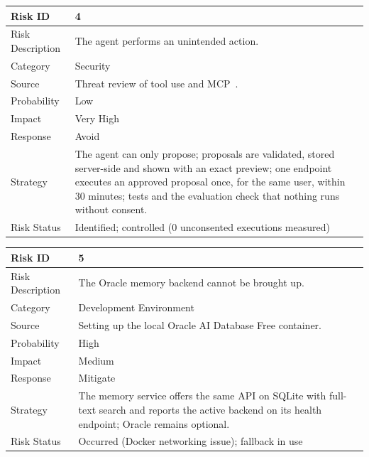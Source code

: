 \begin{table}[!htbp]
\begin{center}
\def\arraystretch{1.5}
\begin{tabularx}{\textwidth}{| l | X |}
\hline
Risk ID	& 4 \\ \hline
Risk Description	& The agent performs an unintended action. \\ \hline
Category	& Security \\ \hline
Source	& Threat review of tool use and MCP~\cite{hou2025mcp}. \\ \hline
Probability	& Low \\ \hline
Impact	& Very High \\ \hline
Response	& Avoid \\ \hline
Strategy	& The agent can only propose; proposals are validated, stored server-side and shown with an exact preview; one endpoint executes an approved proposal once, for the same user, within 30 minutes; tests and the evaluation check that nothing runs without consent. \\ \hline
Risk Status	& Identified; controlled (0 unconsented executions measured) \\ \hline
\end{tabularx}
\end{center}
\label{tab:risk4}
\end{table}

\begin{table}[!htbp]
\begin{center}
\def\arraystretch{1.5}
\begin{tabularx}{\textwidth}{| l | X |}
\hline
Risk ID	& 5 \\ \hline
Risk Description	& The Oracle memory backend cannot be brought up. \\ \hline
Category	& Development Environment \\ \hline
Source	& Setting up the local Oracle AI Database Free container. \\ \hline
Probability	& High \\ \hline
Impact	& Medium \\ \hline
Response	& Mitigate \\ \hline
Strategy	& The memory service offers the same API on SQLite with full-text search and reports the active backend on its health endpoint; Oracle remains optional. \\ \hline
Risk Status	& Occurred (Docker networking issue); fallback in use \\ \hline
\end{tabularx}
\end{center}
\label{tab:risk5}
\end{table}

